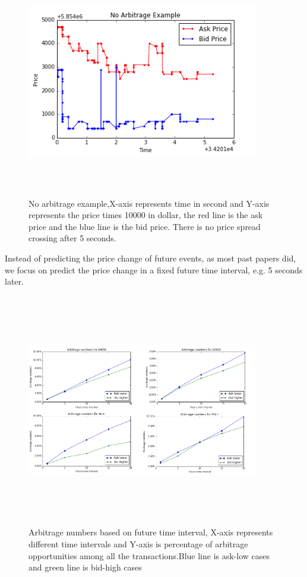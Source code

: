 \begin{figure} [hp]
  \begin{center}
    \includegraphics[width=4in,  height=4in]{figures/no_arbi_example.png}
  \end{center}
\caption{No arbitrage example,X-axis represents time in second and Y-axis represents the price times 10000 in dollar, the red line is the ask price and the blue line is the bid price. There is no price spread crossing after 5 seconds.} \label{fig:no_arbi}
\end{figure}

Instead of predicting the price change of future events,   as most past papers did,   we focus on predict the price change in a fixed future time interval,  e.g. 5 seconds later.

\begin{figure} [hp]
  \begin{center}
    \includegraphics[width=4in,  height=4in]{figures/arbitrage_time.png}
  \end{center}
\caption{Arbitrage numbers based on future time interval, X-axis represents different time intervals and Y-axis is percentage of arbitrage opportunities among all the transactions.Blue line is ask-low cases and green line is bid-high cases} \label{fig:arbitrage_time}
\end{figure}

